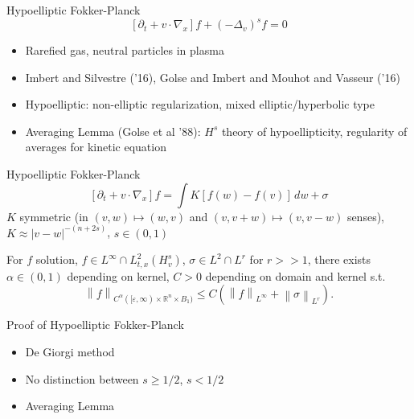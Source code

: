 \documentclass{beamer}
\newcommand{\R}{\mathbb{R}}
\newcommand{\eps}{\varepsilon}
\newcommand{\norm}[1]{\left\lVert#1\right\rVert}
\newcommand{\paren}[1]{\left( #1 \right)}
\newcommand{\bracket}[1]{\left[ #1 \right]}
\newcommand{\del}{\partial}
\newcommand{\grad}{\nabla}
\newcommand{\Laplace}{\Delta}
\begin{document}
\begin{frame}{Hypoelliptic Fokker-Planck}
\[ \bracket{\del_t + v\cdot\grad_x} f + \paren{-\Laplace_v}^s f = 0 \]

\begin{itemize}
\item Rarefied gas, neutral particles in plasma
\item Imbert and Silvestre ('16), Golse and Imbert and Mouhot and Vasseur ('16)
\item Hypoelliptic: non-elliptic regularization, mixed elliptic/hyperbolic type
\item Averaging Lemma (Golse et al '88): $H^s$ theory of hypoellipticity, regularity of averages for kinetic equation
\end{itemize}
\end{frame}


\begin{frame}{Hypoelliptic Fokker-Planck}
\[ \bracket{\del_t + v\cdot\grad_x} f = \int K [f(w)-f(v)] \,dw + \sigma \]
$K$ symmetric (in $(v,w)\mapsto(w,v)$ and $(v,v+w)\mapsto(v,v-w)$ senses), $K \approx |v-w|^{-(n+2s)}$, $s \in (0,1)$

\begin{theorem}
For $f$ solution, $f \in L^\infty \cap L^2_{t,x}(H^s_v)$, $\sigma \in L^2 \cap L^r$ for $r >> 1$, 
there exists $\alpha \in (0,1)$ depending on kernel, $C > 0$ depending on domain and kernel s.t.
\[ \norm{f}_{C^\alpha([\eps,\infty)\times\R^n\times B_1)} \leq C \paren{\norm{f}_{L^\infty} + \norm{\sigma}_{L^r}}. \]
\end{theorem}

\end{frame}


\begin{frame}{Proof of Hypoelliptic Fokker-Planck}
\begin{itemize}
\item De Giorgi method 
\item No distinction between $s \geq 1/2$, $s < 1/2$
\item Averaging Lemma
\end{itemize}

\end{frame}

\end{document}
